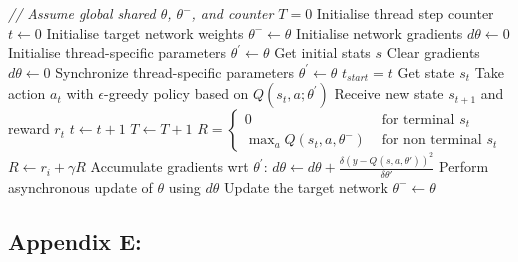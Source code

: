 \documentclass{article}
\begin{document}
\begin{algorithmic}[1]
\State \textit{// Assume global shared  $\theta$, $\theta^{-}$, and counter $T = 0$}
\State Initialise thread step counter $t \gets 0$
\State Initialise target network weights $\theta^{-} \gets \theta$
\State Initialise network gradients $d\theta \gets 0$
\State Initialise thread-specific parameters $\theta^\prime \gets \theta$
\State Get initial stats $s$
    \State Clear gradients $d\theta \gets 0$
    \State Synchronize thread-specific parameters $\theta^\prime \gets \theta$
    \State $t_{start} = t$
    \State Get state $s_t$
        \State Take action $a_t$ with $\epsilon$-greedy policy based on $Q\left(s_t,a;\theta^\prime\right)$
        \State Receive new state $s_{t+1}$ and reward $r_t$
        \State $t \gets t + 1$
        \State $T \gets T + 1$
    \EndWhile
    \State $R= \begin{cases}0 & \text { for terminal } s_t \\ \max _{a} Q\left(s_t, a, \theta^{-}\right) & \text { for non terminal } s_t\end{cases}$
        \State $R \gets r_i + \gamma R$
        \State Accumulate gradients wrt $\theta^\prime$: $d\theta \gets d\theta + \frac{\delta\left( y-Q\left(s, a, \theta\prime\right)\right)^{2}}{\delta\theta\prime}$
    \EndFor
    \State Perform asynchronous update of $\theta$ using $d\theta$
        \State Update the target network $\theta^{-} \gets \theta$
    \EndIf
\EndWhile

\end{algorithmic}


\subsection*{Appendix E: }
\end{document}
